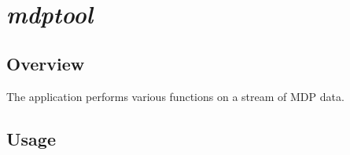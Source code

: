 %
%


\section{\emph{mdptool}}
\subsection{Overview}
The application performs various functions on a stream of MDP data.

\subsection{Usage}
